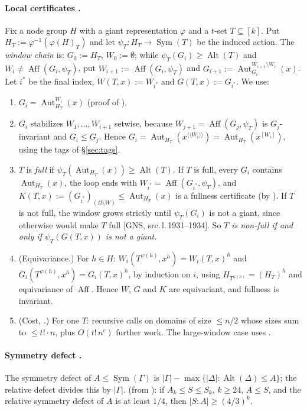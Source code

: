 \documentclass[11pt]{article}
\newenvironment{enumlab}[2][]{\begin{enumerate}\renewcommand{\theenumi}{#1#2{enumi}}%
  \renewcommand{\labelenumi}{(\theenumi)}}{\end{enumerate}}
\theoremstyle{plain}
\theoremstyle{definition}
\theoremstyle{remark}
\theoremstyle{named}
\theoremstyle{namedrm}
\newcommand{\Sym}{\operatorname{Sym}}
\newcommand{\Alt}{\operatorname{Alt}}
\newcommand{\Aut}{\operatorname{Aut}}
\newcommand{\Aff}{\operatorname{Aff}}
\newcommand{\win}[2]{#1^{[#2]}}
\newcommand{\lay}[2]{#1^{\langle\!\langle #2\rangle\!\rangle}}
\newcommand{\src}[2]{[#1, src.\,l.\,#2]}
\begin{document}
\paragraph{Local certificates \cite[Def.~6.1, Alg.~2, Lemma~6.2]{GNS}.}
Fix a node group $H$ with a giant representation $\varphi$ and a $t$-set $T\subseteq[k]$. Put
$H_T:=\varphi^{-1}(\varphi(H)_T)$ and let $\psi_T\colon H_T\to\Sym(T)$ be the induced action. The
\emph{window chain} is: $G_0:=H_T$, $W_0:=\emptyset$; while $\psi_T(G_i)\ge\Alt(T)$ and $W_i\neq\Aff(G_i,\psi_T)$,
put $W_{i+1}:=\Aff(G_i,\psi_T)$ and $G_{i+1}:=\Aut^{W_{i+1}\setminus W_i}_{G_i}(x)$. Let $i^*$ be the final
index, $W(T,x):=W_{i^*}$ and $G(T,x):=G_{i^*}$. We use:
\begin{enumlab}[L]{\arabic}
\item\label{L1} $G_i=\Aut^{W_i}_{H_T}(x)$ (proof of \cite[Lemma~6.2]{GNS}).
\item\label{L2} $G_i$ stabilizes $W_1,\dots,W_{i+1}$ setwise, because $W_{j+1}=\Aff(G_j,\psi_T)$ is
  $G_j$-invariant and $G_i\le G_j$. Hence $G_i=\Aut_{H_T}(\lay{x}{W_i})=\Aut_{H_T}(\win{x}{W_i})$, using the
  tags of \S\ref{sec:tags}.
\item\label{L3} $T$ is \emph{full} if $\psi_T(\Aut_{H_T}(x))\ge\Alt(T)$. If $T$ is full, every $G_i$ contains
  $\Aut_{H_T}(x)$, the loop ends with $W_{i^*}=\Aff(G_{i^*},\psi_T)$, and
  $K(T,x):=(G_{i^*})_{(\Omega\setminus W)}\le\Aut_{H_T}(x)$ is a fullness certificate (by
  \cite[Thm.~5.8]{GNS}). If $T$ is not full, the window grows strictly until $\psi_T(G_i)$ is not a giant,
  since otherwise \cite[Thm.~5.8]{GNS} would make $T$ full \src{GNS}{1931--1934}. So \emph{$T$ is non-full
  if and only if $\psi_T(G(T,x))$ is not a giant.}
\item\label{L4} (Equivariance.) For $h\in H$: $W_i(T^{\varphi(h)},x^h)=W_i(T,x)^h$ and
  $G_i(T^{\varphi(h)},x^h)=G_i(T,x)^h$, by induction on $i$, using $H_{T^{\varphi(h)}}=(H_T)^h$ and equivariance
  of $\Aff$. Hence $W$, $G$ and $K$ are equivariant, and fullness is invariant.
\item\label{L5} (Cost, \cite[Lemma~6.2]{GNS}.) For one $T$: recursive calls on domains of size $\le n/2$
  whose sizes sum to $\le t!\cdot n$, plus $O(t!\,n^{c})$ further work. The large-window case uses
  \cite[Thm.~5.9]{GNS}.
\end{enumlab}

\paragraph{Symmetry defect \cite[\S6.3]{GNS}.} The symmetry defect of $A\le\Sym(\Gamma)$ is
$|\Gamma|-\max\{|\Delta|:\Alt(\Delta)\le A\}$; the relative defect divides this by $|\Gamma|$.
\cite[Cor.~6.5]{GNS} (from \cite[Thm.~5.2A,B]{DM96}): if $A_k\le S\le S_k$, $k\ge24$, $A\le S$, and the
relative symmetry defect of $A$ is at least $1/4$, then $|S:A|\ge(4/3)^k$.
\end{document}
